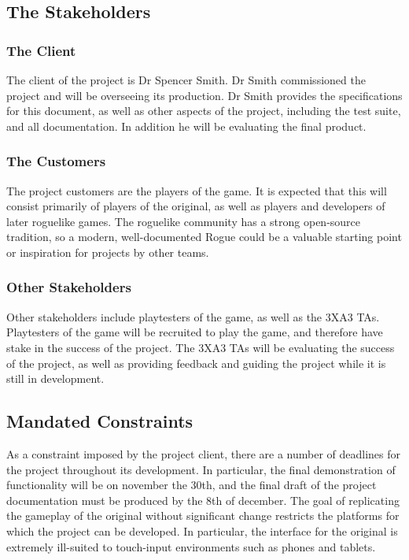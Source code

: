 \documentclass[12pt, titlepage]{article}
\begin{document}
	\subsection{The Stakeholders}

		\subsubsection{The Client}

		The client of the project is Dr Spencer Smith. Dr Smith commissioned the project and will be overseeing its production. Dr Smith provides the specifications for this document, as well as other aspects of the project, including the test suite, and all documentation. In addition he will be evaluating the final product.

		\subsubsection{The Customers}

		The project customers are the players of the game. It is expected that this will consist primarily of players of the original, as well as players and developers of later roguelike games. The roguelike community has a strong open-source tradition, so a modern, well-documented Rogue could be a valuable starting point or inspiration for projects by other teams.

		\subsubsection{Other Stakeholders}

Other stakeholders include playtesters of the game, as well as the 3XA3 TAs. Playtesters of the game will be recruited to play the game, and therefore have stake in the success of the project. The 3XA3 TAs will be evaluating the success of the project, as well as providing feedback and guiding the project while it is still in development.

	\subsection{Mandated Constraints}

As a constraint imposed by the project client, there are a number of deadlines for the project throughout its development. In particular, the final demonstration of functionality will be on november the 30th, and the final draft of the project documentation must be produced by the 8th of december. The goal of replicating the gameplay of the original without significant change restricts the platforms for which the project can be developed. In particular, the interface for the original is extremely ill-suited to touch-input environments such as phones and tablets. 
\end{document}
